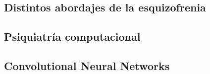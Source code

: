 \subsection{Distintos abordajes de la esquizofrenia}

\subsection{Psiquiatría computacional}

\subsection{Convolutional Neural Networks}